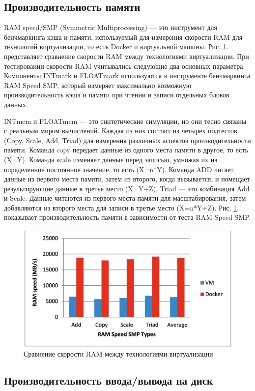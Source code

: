 \documentclass{mirea}
\begin{document}
	\subsection{Производительность памяти}
	
	RAM speed/SMP (Symmetric Multiprocessing) — это инструмент для бенчмаркинга кэша и памяти, используемый для измерения скорости RAM для технологий виртуализации, то есть Docker и виртуальной машины. Рис. \ref{fig:pic6}. представляет сравнение скорости RAM между технологиями виртуализации. При тестировании скорости RAM учитывались следующие два основных параметра. Компоненты INTmark и FLOATmark используются в инструменте бенчмаркинга RAM Speed SMP, который измеряет максимально возможную производительность кэша и памяти при чтении и записи отдельных блоков данных.
	
	INTmem и FLOATmem — это синтетические симуляции, но они тесно связаны с реальным миром вычислений. Каждая из них состоит из четырех подтестов (Copy, Scale, Add, Triad) для измерения различных аспектов производительности памяти. Команда copy передает данные из одного места памяти в другое, то есть (X=Y). Команда scale изменяет данные перед записью, умножая их на определенное постоянное значение, то есть (X=n*Y). Команда ADD читает данные из первого места памяти, затем из второго, когда вызывается, и помещает результирующие данные в третье место (X=Y+Z). Triad — это комбинация Add и Scale. Данные читаются из первого места памяти для масштабирования, затем добавляются из второго места для записи в третье место (X=n*Y+Z). Рис. \ref{fig:pic6}. показывает производительность памяти в зависимости от теста RAM Speed SMP.
	
	\begin{figure}[H]
		\centering
		\includegraphics[width=.6\textwidth]{img6}
		\parskip=6pt
		\caption{Сравнение скорости RAM между технологиями виртуализации}
		\label{fig:pic6}
	\end{figure}

	\subsection{Производительность ввода/вывода на диск}
	
\end{document}
